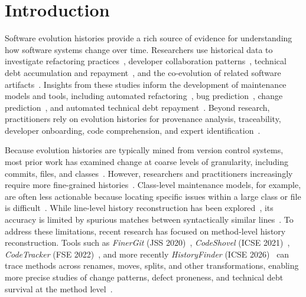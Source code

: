 \section{Introduction}
Software evolution histories provide a rich source of evidence for understanding how software systems change over time. Researchers use historical data to investigate refactoring practices~\cite{vassallo2019large}, developer collaboration patterns~\cite{kalliamvakou2015open}, technical debt accumulation and repayment~\cite{martini2015investigating,chowdhury_evidence_2025,digkas2018developers}, and the co-evolution of related software artifacts~\cite{zaidman2011studying,wang2021understanding}. Insights from these studies inform the development of maintenance models and tools, including automated refactoring~\cite{baqais2020automatic}, bug prediction~\cite{Wattanakriengkrai:2022,wang2022bugpre,PASCARELLA:2020,Rahman:2017}, change prediction~\cite{arvanitou2017method,chowdhury2022empirical,chowdhury:2022,Shihab:2012}, and automated technical debt repayment~\cite{mastropaolo2023towards}. Beyond research, practitioners rely on evolution histories for provenance analysis, traceability, developer onboarding, code comprehension, and expert identification~\cite{grund:2021}.

Because evolution histories are typically mined from version control systems, most prior work has examined change at coarse levels of granularity, including commits, files, and classes~\cite{negara2012dangerous}. However, researchers and practitioners increasingly require more fine-grained histories~\cite{Ryosuke:2019,Li:2018,grund:2021}. Class-level maintenance models, for example, are often less actionable because locating specific issues within a large class or file is difficult~\cite{PASCARELLA:2020,grund:2021,Mo:2022}. While line-level history reconstruction has been explored~\cite{Canfora:2007,Chen:2001}, its accuracy is limited by spurious matches between syntactically similar lines~\cite{Daniela:2014,Francisco:2017}. To address these limitations, recent research has focused on method-level history reconstruction. Tools such as \emph{FinerGit} (JSS 2020)~\cite{HIGO:2020}, \emph{CodeShovel} (ICSE 2021)~\cite{grund:2021}, \emph{CodeTracker} (FSE 2022)~\cite{jodavi_accurate_2022}, and more recently \emph{HistoryFinder} (ICSE 2026)~\cite{islam_historyfinder_2025} can trace methods across renames, moves, splits, and other transformations, enabling more precise studies of change patterns, defect proneness, and technical debt survival at the method level~\cite{chowdhury_evidence_2025,chowdhury2024method,chowdhury2025good}.

